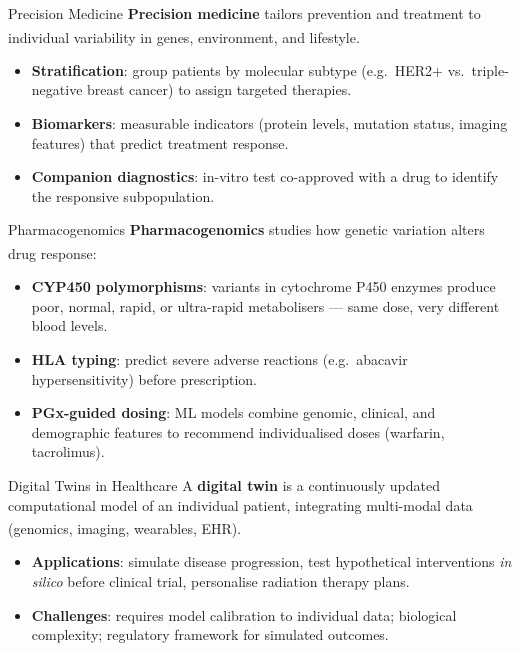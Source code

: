 \begin{v3topic}{Precision Medicine}
    \textbf{Precision medicine} tailors prevention and treatment to individual variability in genes, environment, and lifestyle\textsuperscript{\cite[][pp.~3--18]{bocciaPersonalisedHealthCare2020}}.
    \begin{itemize}
        \item \textbf{Stratification}: group patients by molecular subtype (e.g.\ HER2+ vs.\ triple-negative breast cancer) to assign targeted therapies.
        \item \textbf{Biomarkers}: measurable indicators (protein levels, mutation status, imaging features) that predict treatment response.
        \item \textbf{Companion diagnostics}: in-vitro test co-approved with a drug to identify the responsive subpopulation.
    \end{itemize}

\end{v3topic}
\begin{v3topic}{Pharmacogenomics}
    \textbf{Pharmacogenomics} studies how genetic variation alters drug response\textsuperscript{\cite[][pp.~50--75]{bocciaPersonalisedHealthCare2020}}:
    \begin{itemize}
        \item \textbf{CYP450 polymorphisms}: variants in cytochrome P450 enzymes produce poor, normal, rapid, or ultra-rapid metabolisers — same dose, very different blood levels.
        \item \textbf{HLA typing}: predict severe adverse reactions (e.g.\ abacavir hypersensitivity) before prescription.
        \item \textbf{PGx-guided dosing}: ML models combine genomic, clinical, and demographic features to recommend individualised doses (warfarin, tacrolimus).
    \end{itemize}

\end{v3topic}
\begin{v3topic}{Digital Twins in Healthcare}
    A \textbf{digital twin} is a continuously updated computational model of an individual patient, integrating multi-modal data (genomics, imaging, wearables, EHR)\textsuperscript{\cite[][pp.~110--130]{bocciaPersonalisedHealthCare2020}}.
    \begin{itemize}
        \item \textbf{Applications}: simulate disease progression, test hypothetical interventions \textit{in silico} before clinical trial, personalise radiation therapy plans.
        \item \textbf{Challenges}: requires model calibration to individual data; biological complexity; regulatory framework for simulated outcomes.
    \end{itemize}

\end{v3topic}
